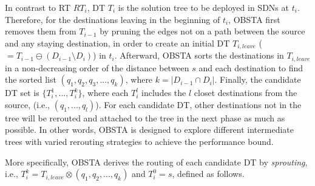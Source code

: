 \documentclass[10pt, conference, letterpaper]{IEEEtran}
\theoremstyle{definition}
\begin{document}
In contrast to RT $RT_i$, DT $T_i$ is the solution tree to be deployed in SDNs at $t_i$. Therefore, for the destinations leaving in the beginning of $t_i$, OBSTA first removes them from $T_{i-1}$ by pruning the edges not on a path between the source and any staying destination, in order to create an initial DT $T_{i,leave}$ ($=T_{i-1}\ominus (D_{i-1}\setminus D_i)$) in $t_i$.
Afterward, OBSTA sorts the destinations in $T_{i,leave}$ in a non-decreasing order of the distance between $s$ and each destination to find the sorted list $(q_{1},q_{2},q_{3},...,q_{k})$, where $k=|D_{i-1}\cap D_{i}|$.
Finally, the candidate DT set is $\{T_{i}^{1}, ..., T_{i}^{k}\}$, where each $T_{i}^{l}$ includes the $l$ closet destinations from the source, (i.e., $(q_{1},...,q_{l})$). For each candidate DT, other destinations not in the tree will be rerouted
and attached to the tree in the next phase as much as possible.
In other words, OBSTA is designed to explore different intermediate trees with varied rerouting strategies to achieve the performance bound.

More specifically, OBSTA derives the routing of each candidate DT by \emph{sprouting}, i.e., $T_{i}^{k}=T_{i,leave}\otimes(q_{1},q_{2},...,q_{k})$ and $T_{i}^{0}={s}$, defined as follows.
\end{document}
